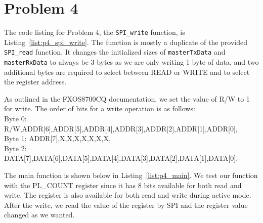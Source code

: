 \section*{Problem 4}
The code listing for Problem 4, the \texttt{SPI\_write} function, is Listing~\ref{list:p4_spi_write}. The function is mostly a duplicate of the provided \texttt{SPI\_read} function. It changes the initialized sizes of \texttt{masterTxData} and \texttt{masterRxData} to always be 3 bytes as we are only writing 1 byte of data, and two additional bytes are required to select between READ or WRITE and to select the register address.

As outlined in the FXOS8700CQ documentation, we set the value of R/W to 1 for write. The order of bits for a write operation is as follows:\\
Byte 0: R/W,ADDR[6],ADDR[5],ADDR[4],ADDR[3],ADDR[2],ADDR[1],ADDR[0],\\
Byte 1: ADDR[7],X,X,X,X,X,X,X,\\
Byte 2: DATA[7],DATA[6],DATA[5],DATA[4],DATA[3],DATA[2],DATA[1],DATA[0].


The main function is shown below in Listing~\ref{list:p4_main}. We test our function with the PL\_COUNT register since it has 8 bits available for both read and write. The register is also available for both read and write during active mode. After the write, we read the value of the register by SPI and the register value changed as we wanted.
